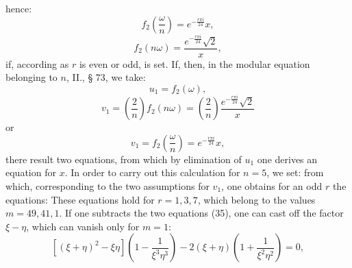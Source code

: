hence:
\[ f_2\left(\frac{\omega}{n}\right) = e^{-\frac{r\pi i}{24}}x, \]
\[ f_2(n\omega) = \frac{e^{-\frac{r\pi i}{24}}\sqrt2}{x}, \]
if, according as $r$ is even or odd,
is set. If, then, in the modular equation belonging to $n$,
 II., § 73, we take:
\[ u_1 = f_2(\omega), \]
\[ v_1 = \left(\frac2n\right) f_2(n\omega) = \left(\frac2n\right) \frac{e^{-\frac{r\pi i}{24}}\sqrt2}{x} \]
or
\[ v_1 = f_2\left(\frac{\omega}{n}\right) = e^{-\frac{r\pi i}{24}}x, \]
there result two equations, from which by elimination
 of $u_1$ one derives an equation for $x$.
In order to carry out this calculation for $n = 5$, we set:
from which, corresponding to the two assumptions for $v_1$, one obtains
for an odd $r$ the equations:
These equations hold for $r = 1, 3, 7$, which belong to the values
$m = 49, 41, 1$.
If one subtracts the two equations (35), one can cast off
the factor $\xi - \eta$, which can vanish only for $m = 1$:
\[ [(\xi+\eta)^2 - \xi\eta]\left(1-\frac1{\xi^3\eta^3}\right) - 2(\xi+\eta)\left(1+\frac1{\xi^2\eta^2}\right) = 0, \]
